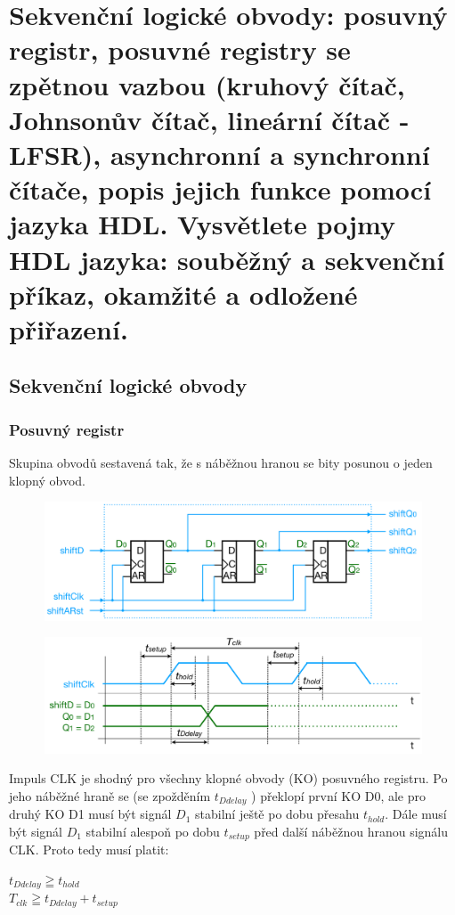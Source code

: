 \section{Sekvenční logické obvody: posuvný registr, posuvné registry se zpětnou vazbou (kruhový čítač, Johnsonův čítač, lineární čítač - LFSR), asynchronní a synchronní čítače, popis jejich funkce pomocí jazyka HDL. Vysvětlete pojmy HDL jazyka: souběžný a sekvenční příkaz, okamžité a odložené přiřazení.}
\subsection{Sekvenční logické obvody}
\subsubsection{Posuvný registr}
Skupina obvodů sestavená tak, že s náběžnou hranou se bity posunou o jeden klopný obvod.\\
\begin{figure}[h!]
    \centering
    \includegraphics[scale = 0.3]{img/PosuvReg.png}
\end{figure}
\begin{figure}[h!]
    \centering
    \includegraphics*[scale = 0.3]{img/CasPosuv.png}
\end{figure}
\newpage
Impuls CLK je shodný pro všechny klopné obvody (KO) posuvného registru. Po jeho náběžné hraně se (se zpožděním \(t_{Ddelay}\) ) překlopí první KO D0, ale pro druhý KO D1 musí být signál \(D_1\) stabilní ještě po dobu přesahu \(t_{hold}\). Dále musí být signál \(D_1\) stabilní alespoň po dobu \(t_{setup}\) před další náběžnou hranou signálu CLK. Proto tedy musí platit:
\begin{center}
    \(t_{Ddelay} \geqq t_{hold}\)\\
    \(T_{clk} \geqq t_{Ddelay} + t_{setup}\)
\end{center}

